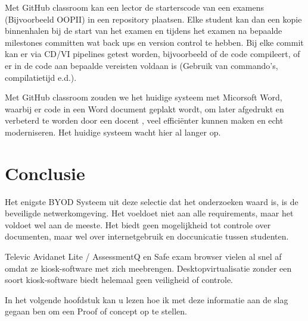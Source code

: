 Met GitHub classroom kan een lector de starterscode van een examens (Bijvoorbeeld OOPII) in een repository plaatsen. Elke student kan dan een kopie binnenhalen bij de start van het examen en tijdens het examen na bepaalde milestones committen wat back ups en version control te hebben. Bij elke commit kan er via CD/VI pipelines getest worden, bijvoorbeeld of de code compileert, of er in de code aan bepaalde vereisten voldaan is (Gebruik van commando's, compilatietijd e.d.). 

Met GitHub classroom zouden we het huidige systeem met Micorsoft Word, waarbij er code in een Word document geplakt wordt, om later afgedrukt en verbeterd te worden door een docent \autocite{Roobrouck2019}, veel effici\"{e}nter kunnen maken en echt moderniseren. Het huidige systeem wacht hier al langer op. 
\newpage 

\section{Conclusie}

Het enigste BYOD Systeem uit deze selectie dat het onderzoeken waard is, is de beveiligde netwerkomgeving. Het voeldoet niet aan alle requirements, maar het voldoet wel aan de meeste. Het biedt geen mogelijkheid tot controle over documenten, maar wel over internetgebruik en doccunicatie tussen studenten.

 Televic Avidanet Lite / AssessmentQ en Safe exam browser vielen al snel af omdat ze kiosk-software met zich meebrengen. Desktopvirtualisatie zonder een soort kiosk-software biedt helemaal geen veiligheid of controle. 

In het volgende hoofdstuk kan u lezen hoe ik met deze informatie aan de slag gegaan ben om een Proof of concept op te stellen. 

